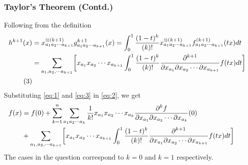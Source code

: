 \begin{frame}
\frametitle{Taylor's Theorem (Contd.)}
Following from the definition
\begin{align*}
\hspace{-18pt} h^{k+1}(x)&=x^{\otimes (k+1)}_{a_1a_2\cdots a_{k+1}}g^{k+1}_{a_1a_2\cdots a_{k+1}}(x)=\int_0^1\bfrac{(1-t)^{k}}{(k)!}x^{\otimes (k+1)}_{a_1a_2\cdots a_{k+1}}f^{(k+1)}_{a_1a_2\cdots a_{k+1}}(tx)dt\\
&=\sum_{a_1,a_2,\cdots a_{k+1}}\hspace{-1pt}\left[x_{a_1}x_{a_2}\cdots x_{a_{k+1}}\int_0^1\bfrac{(1-t)^{k}}{(k)!}\bfrac{\partial^{k+1}}{\partial x_{a_1}\partial x_{a_2}\cdots\partial x_{a_{k+1}}}f(tx)dt\right]\\
\label{eq:3}\tag{3}
\end{align*}
Substituting \ref{eq:1} and \ref{eq:3} in \ref{eq:2}, we get
\begin{align*}
\hspace{-18pt} f(x)&=f(0)+\sum_{k=1}^{n}\sum_{a_1a_2\cdots a_k}\bfrac{1}{k!}x_{a_1}x_{a_2}\cdots x_{a_k}\bfrac{\partial^{k}f}{\partial x_{a_1}\partial x_{a_2}\cdots\partial x_{a_k}}(0)\\
&+\sum_{a_1,a_2,\cdots a_{k+1}}\hspace{-1pt}\left[x_{a_1}x_{a_2}\cdots x_{a_{k+1}}\int_0^1\bfrac{(1-t)^{k}}{(k)!}\bfrac{\partial^{k+1}}{\partial x_{a_1}\partial x_{a_2}\cdots\partial x_{a_{k+1}}}f(tx)dt\right]
\end{align*}
The cases in the question correspond to $k=0$ and $k=1$ respectively.
\end{frame}
